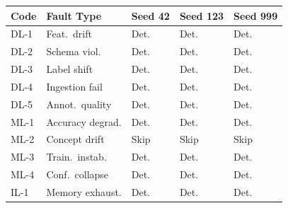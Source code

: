 \documentclass[conference]{IEEEtran}
\begin{document}
\begin{figure}[t]
\centering
\setlength{\tabcolsep}{3pt}
\renewcommand{\arraystretch}{1.0}
\begin{tabular}{C{0.65cm}C{1.75cm}C{0.85cm}C{0.85cm}C{0.85cm}}
\toprule
\textbf{Code} & \textbf{Fault Type} &
  \textbf{Seed 42} & \textbf{Seed 123} & \textbf{Seed 999} \\
\midrule
DL-1 & Feat.\ drift      & \textcolor{GreenText}{Det.} & \textcolor{GreenText}{Det.} & \textcolor{GreenText}{Det.} \\
DL-2 & Schema viol.      & \textcolor{GreenText}{Det.} & \textcolor{GreenText}{Det.} & \textcolor{GreenText}{Det.} \\
DL-3 & Label shift       & \textcolor{GreenText}{Det.} & \textcolor{GreenText}{Det.} & \textcolor{GreenText}{Det.} \\
DL-4 & Ingestion fail    & \textcolor{GreenText}{Det.} & \textcolor{GreenText}{Det.} & \textcolor{GreenText}{Det.} \\
DL-5 & Annot.\ quality   & \textcolor{GreenText}{Det.} & \textcolor{GreenText}{Det.} & \textcolor{GreenText}{Det.} \\
ML-1 & Accuracy degrad.  & \textcolor{GreenText}{Det.} & \textcolor{GreenText}{Det.} & \textcolor{GreenText}{Det.} \\
ML-2 & Concept drift     & Skip & Skip & Skip \\
ML-3 & Train.\ instab.   & \textcolor{GreenText}{Det.} & \textcolor{GreenText}{Det.} & \textcolor{GreenText}{Det.} \\
ML-4 & Conf.\ collapse   & \textcolor{GreenText}{Det.} & \textcolor{GreenText}{Det.} & \textcolor{GreenText}{Det.} \\
IL-1 & Memory exhaust.   & \textcolor{GreenText}{Det.} & \textcolor{GreenText}{Det.} & \textcolor{GreenText}{Det.} \\

\end{tabular}
\end{figure}
\end{document}
